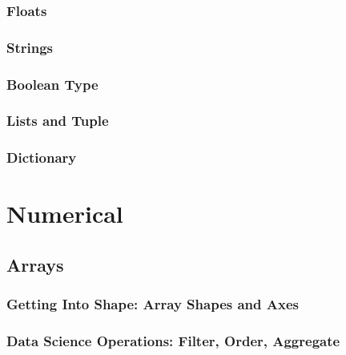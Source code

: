 \documentclass[letterpaper,10pt,english]{sphinxmanual}
\begin{document}
\subsection{Floats}
\label{\detokenize{Python/Python:floats}}

\subsection{Strings}
\label{\detokenize{Python/Python:strings}}

\subsection{Boolean Type}
\label{\detokenize{Python/Python:boolean-type}}

\subsection{Lists and Tuple}
\label{\detokenize{Python/Python:lists-and-tuple}}

\subsection{Dictionary}
\label{\detokenize{Python/Python:dictionary}}
\sphinxstepscope


\chapter{Numerical}
\label{\detokenize{Numerical/Numerical:numerical}}\label{\detokenize{Numerical/Numerical::doc}}

\section{Arrays}
\label{\detokenize{Numerical/Numerical:arrays}}

\subsection{Getting Into Shape: Array Shapes and Axes}
\label{\detokenize{Numerical/Numerical:getting-into-shape-array-shapes-and-axes}}

\subsection{Data Science Operations: Filter, Order, Aggregate}
\label{\detokenize{Numerical/Numerical:data-science-operations-filter-order-aggregate}}
\end{document}
